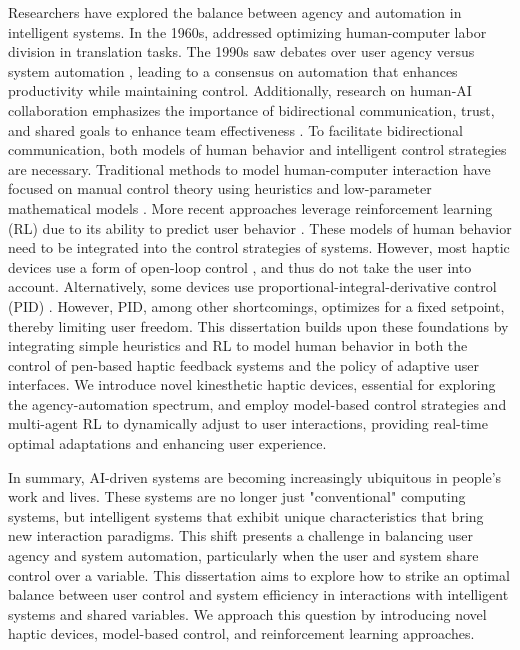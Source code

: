 Researchers have explored the balance between agency and automation in intelligent systems. In the 1960s, \citeauthor{BarHillel1960} \cite{BarHillel1960} addressed optimizing human-computer labor division in translation tasks. The 1990s saw debates over user agency versus system automation \cite{Shneiderman1997}, leading to a consensus on automation that enhances productivity while maintaining control. Additionally, research on human-AI collaboration emphasizes the importance of bidirectional communication, trust, and shared goals to enhance team effectiveness \cite{demir2017team, shively2017human}. To facilitate bidirectional communication, both models of human behavior and intelligent control strategies are necessary. Traditional methods to model human-computer interaction have focused on manual control theory \cite{McRuer1967, Costello1968} using heuristics \cite{card1986model, card1980klm, card1983the, kieras1997overview, anderson1997act} and low-parameter mathematical models \cite{fitts1954information, hick1952rate}. More recent approaches leverage reinforcement learning (RL) due to its ability to predict user behavior \cite{jokinen2021multitasking, jokinen2021touchscreen, gebhardt2020hierarchical}. These models of human behavior need to be integrated into the control strategies of systems. However, most haptic devices use a form of open-loop control \cite{yamaoka2013depend}, and thus do not take the user into account. Alternatively, some devices use proportional-integral-derivative control (PID) \cite{abut2018interface, ramos2016wavenet, pothi2014design}. However, PID, among other shortcomings, optimizes for a fixed setpoint, thereby limiting user freedom. This dissertation builds upon these foundations by integrating simple heuristics and RL to model human behavior in both the control of pen-based haptic feedback systems and the policy of adaptive user interfaces. We introduce novel kinesthetic haptic devices, essential for exploring the agency-automation spectrum, and employ model-based control strategies and multi-agent RL to dynamically adjust to user interactions, providing real-time optimal adaptations and enhancing user experience.

In summary, AI-driven systems are becoming increasingly ubiquitous in people's work and lives. These systems are no longer just "conventional" computing systems, but intelligent systems that exhibit unique characteristics that bring new interaction paradigms. This shift presents a challenge in balancing user agency and system automation, particularly when the user and system share control over a variable. This dissertation aims to explore how to strike an optimal balance between user control and system efficiency in interactions with intelligent systems and shared variables. We approach this question by introducing novel haptic devices, model-based control, and reinforcement learning approaches.